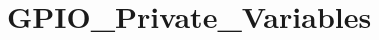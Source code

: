 \hypertarget{group___g_p_i_o___private___variables}{\section{G\-P\-I\-O\-\_\-\-Private\-\_\-\-Variables}
\label{group___g_p_i_o___private___variables}
}
